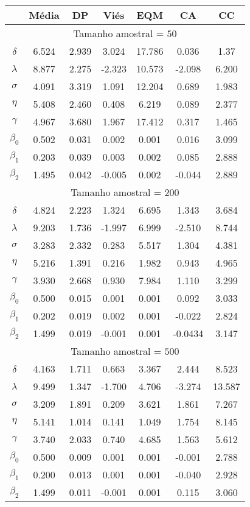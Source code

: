 \documentclass{sciposter}
\begin{document}
\begin{multicols}{3}
{\begin{table}[H]
\centering
\begin{tabular}[t]{c|c|c|c|c|c|c}
\hline
& Média & DP & Viés & EQM & CA & CC\\
\hline
\multicolumn{7}{c}{Tamanho amostral = $50$} \\
\hline
$\delta$ & 6.524 & 2.939 & 3.024 & 17.786 & 0.036 & 1.37\\
$\lambda$ & 8.877 & 2.275 & -2.323 & 10.573 & -2.098 & 6.200\\
$\sigma$ & 4.091 & 3.319 & 1.091 & 12.204 & 0.689 & 1.983\\
$\eta$ & 5.408 & 2.460 & 0.408 & 6.219 & 0.089 & 2.377\\
$\gamma$ & 4.967 & 3.680 & 1.967 & 17.412 & 0.317 & 1.465\\
$\beta_0$ & 0.502 & 0.031 & 0.002 & 0.001 & 0.016 & 3.099\\
$\beta_1$ & 0.203 & 0.039 & 0.003 & 0.002 & 0.085 & 2.888\\
$\beta_2$ & 1.495 & 0.042 & -0.005 & 0.002 & -0.044 & 2.889\\
\hline
\multicolumn{7}{c}{Tamanho amostral = $200$} \\
\hline
$\delta$ & 4.824 & 2.223 & 1.324 & 6.695 & 1.343 & 3.684\\
$\lambda$ & 9.203 & 1.736 & -1.997 & 6.999 & -2.510 & 8.744\\
$\sigma$ & 3.283 & 2.332 & 0.283 & 5.517 & 1.304 & 4.381\\
$\eta$ & 5.216 & 1.391 & 0.216 & 1.982 & 0.943 & 4.965\\
$\gamma$ & 3.930 & 2.668 & 0.930 & 7.984 & 1.110 & 3.299\\
$\beta_0$ & 0.500 & 0.015 & 0.001 & 0.001 & 0.092 & 3.033\\
$\beta_1$ & 0.202 & 0.019 & 0.002 & 0.001 & -0.022 & 2.824\\
$\beta_2$ & 1.499 & 0.019 & -0.001 & 0.001 & -0.0434 & 3.147\\
\hline
\multicolumn{7}{c}{Tamanho amostral = $500$} \\
\hline
$\delta$ & 4.163 & 1.711 & 0.663 & 3.367 & 2.444 & 8.523\\
$\lambda$ & 9.499 & 1.347 & -1.700 & 4.706 & -3.274 & 13.587\\
$\sigma$ & 3.209 & 1.891 & 0.209 & 3.621 & 1.861 & 7.267\\
$\eta$ & 5.141 & 1.014 & 0.141 & 1.049 & 1.754 & 8.145\\
$\gamma$ & 3.740 & 2.033 & 0.740 & 4.685 & 1.563 & 5.612\\
$\beta_0$ & 0.500 & 0.009 & 0.001 & 0.001 & -0.001 & 2.788\\
$\beta_1$ & 0.200 & 0.013 & 0.001 & 0.001 & -0.040 & 2.928\\
$\beta_2$ & 1.499 & 0.011 & -0.001 & 0.001 & 0.115 & 3.060\\
\hline
\end{tabular}
\end{table}


}
\end{multicols}
\end{document}
